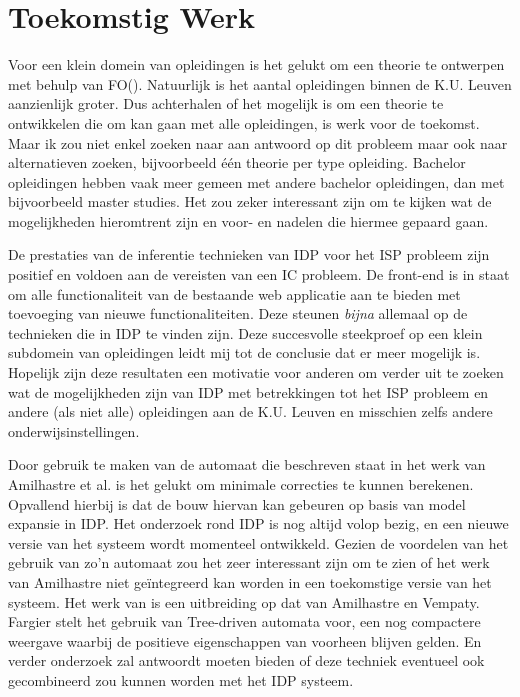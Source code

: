 \chapter{Toekomstig Werk}
\label{cha:toekomstigwerk}
Voor een klein domein van opleidingen is het gelukt om een theorie te ontwerpen met behulp van FO(\textperiodcentered). Natuurlijk is het aantal opleidingen binnen de K.U. Leuven aanzienlijk groter. Dus achterhalen of het mogelijk is om een theorie te ontwikkelen die om kan gaan met alle opleidingen, is werk voor de toekomst. Maar ik zou niet enkel zoeken naar aan antwoord op dit probleem maar ook naar alternatieven zoeken, bijvoorbeeld \'{e}\'{e}n theorie per type opleiding. Bachelor opleidingen hebben vaak meer gemeen met andere bachelor opleidingen, dan met bijvoorbeeld master studies. Het zou zeker interessant zijn om te kijken wat de mogelijkheden hieromtrent zijn en voor- en nadelen die hiermee gepaard gaan. 

De prestaties van de inferentie technieken van IDP voor het ISP probleem zijn positief en voldoen aan de vereisten van een IC probleem. De front-end is in staat om alle functionaliteit van de bestaande web applicatie aan te bieden met toevoeging van nieuwe functionaliteiten. Deze steunen \textit{bijna} allemaal op de technieken die in IDP te vinden zijn. Deze succesvolle steekproef op een klein subdomein van opleidingen leidt mij tot de conclusie dat er meer mogelijk is. Hopelijk zijn deze resultaten een motivatie voor anderen om verder uit te zoeken wat de mogelijkheden zijn van IDP met betrekkingen tot het ISP probleem en andere (als niet alle) opleidingen aan de K.U. Leuven en misschien zelfs andere onderwijsinstellingen. 

Door gebruik te maken van de automaat die beschreven staat in het werk van Amilhastre et al. is het gelukt om minimale correcties te kunnen berekenen. Opvallend hierbij is dat de bouw hiervan kan gebeuren op basis van model expansie in IDP. Het onderzoek rond IDP is nog altijd volop bezig, en een nieuwe versie van het systeem wordt momenteel ontwikkeld. Gezien de voordelen van het gebruik van zo'n automaat zou het zeer interessant zijn om te zien of het werk van Amilhastre niet ge\"{i}ntegreerd kan worden in een toekomstige versie van het systeem. Het werk van \citet{fargier2004compiling} is een uitbreiding op dat van Amilhastre en Vempaty. Fargier stelt het gebruik van Tree-driven automata voor, een nog compactere weergave waarbij de positieve eigenschappen van voorheen blijven gelden. En verder onderzoek zal antwoordt moeten bieden of deze techniek eventueel ook gecombineerd zou kunnen worden met het IDP systeem.